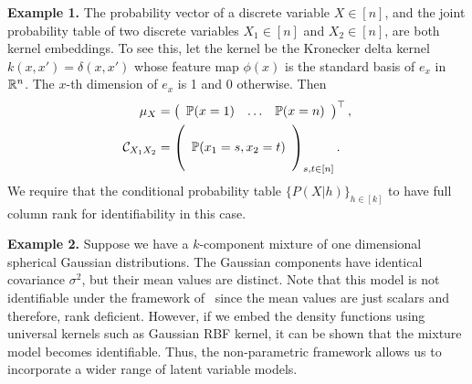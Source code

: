 \documentclass{article}
\begin{document}
{\bf Example 1.} The probability vector of a discrete variable $X \in [n]$, and the joint probability table of two discrete variables $X_1 \in [n]$ and $X_2 \in [n]$, are both kernel embeddings. To see this, let the kernel be the Kronecker delta kernel $k(x,x') = \delta(x,x')$ whose feature map $\phi(x)$ is the standard basis of $e_{x}$ in $\mathbb{R}^n$. The $x$-th dimension of $e_{x}$ is 1 and 0 otherwise. Then
\begin{align}
    \mu_X
		& = \left(
      \begin{array}{ccc}
         \mathbb{P}(x = 1) &
         \hdots &
         \mathbb{P}(x = n)
       \end{array}
    \right)^\top, \nonumber \\
		\mathcal{C}_{X_1X_2}
		&=
		\left(
        \begin{array}{c}
            \cr
            \mathbb{P}(x_1=s,x_2=t) \cr
						\cr
        \end{array}
    \right)_{s,t \in [n]}. \nonumber
\end{align}
We require that the conditional probability table $\{P(X|h)\}_{h\in [k]}$ to  have full column rank for identifiability in this case.


{\bf Example 2.} Suppose we have a $k$-component mixture of one dimensional  spherical Gaussian distributions. The Gaussian components have identical covariance  $\sigma^2$, but their mean values are distinct. Note that this model is not identifiable under the framework of~\cite{Hsu13} since the mean values are just scalars and therefore, rank deficient. However, if we embed the density functions using universal kernels such as Gaussian RBF kernel, it can be shown that the mixture model becomes identifiable. Thus, the non-parametric framework allows us to incorporate a wider range of latent variable  models.
 


%
 
\end{document}
